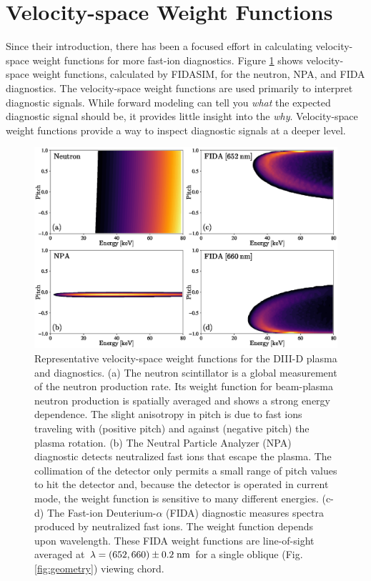 \section{Velocity-space Weight Functions}
Since their introduction, there has been a focused effort in calculating velocity-space weight functions for more fast-ion diagnostics\cite{salewski2011,salewski2014,jacobsen2015,salewski2015,salewski2016}. Figure \ref{fig:vs_weights} shows velocity-space weight functions, calculated by FIDASIM, for the neutron, NPA, and FIDA diagnostics. The velocity-space weight functions are used primarily to interpret diagnostic signals. While forward modeling can tell you \textit{what} the expected diagnostic signal should be, it provides little insight into the \textit{why}. Velocity-space weight functions provide a way to inspect diagnostic signals at a deeper level. 
\begin{figure}[ht]
    \centering
    \includegraphics[width=13cm]{figures/velocity_space_weights.eps}
    \caption{Representative velocity-space weight functions for the DIII-D plasma and diagnostics. (a) The neutron scintillator is a global measurement of the neutron production rate. Its weight function for beam-plasma neutron production is spatially averaged and shows a strong energy dependence. The slight anisotropy in pitch is due to fast ions traveling with (positive pitch) and against (negative pitch) the plasma rotation. (b) The Neutral Particle Analyzer (NPA) diagnostic detects neutralized fast ions that escape the plasma. The collimation of the detector only permits a small range of pitch values to hit the detector and, because the detector is operated in current mode, the weight function is sensitive to many different energies. (c-d) The Fast-ion Deuterium-$\alpha$ (FIDA) diagnostic measures spectra produced by neutralized fast ions. The weight function 
depends upon wavelength. These FIDA weight functions are line-of-sight 
averaged at $\lambda = (652,660) \pm 0.2 \;\rm{nm}$ for a single oblique (Fig. \ref{fig:geometry}) viewing chord.}
    \label{fig:vs_weights}
\end{figure}

